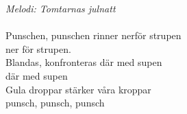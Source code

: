 {\footnotesize\textit{Melodi: Tomtarnas julnatt}}\\
\\
Punschen, punschen rinner nerför strupen\\
ner för strupen.\\
Blandas, konfronteras där med supen\\
där med supen\\
Gula droppar stärker våra kroppar\\
punsch, punsch, punsch
